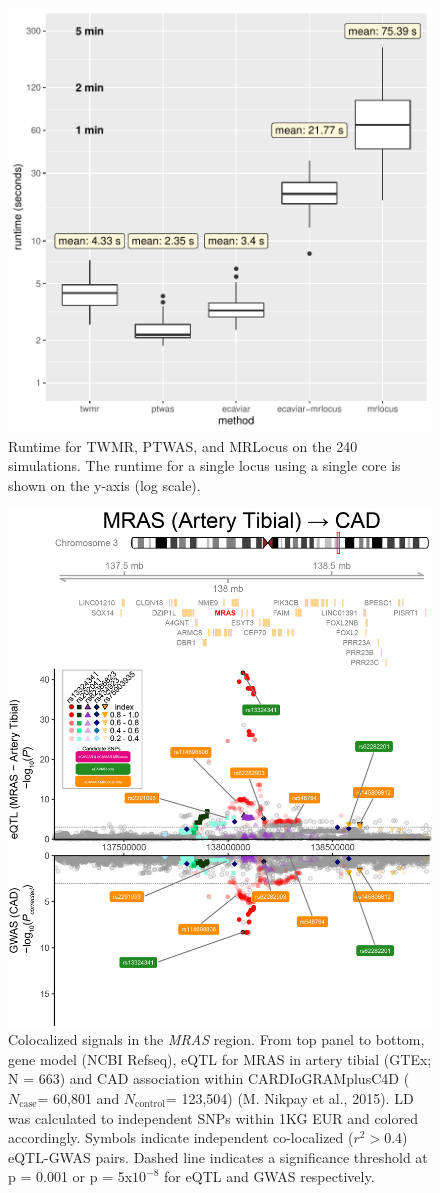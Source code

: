 \documentclass[11pt]{article}
\newcommand{\Ncase}{$N_{\textrm{case}}$\xspace}
\newcommand{\Ncontrol}{$N_{\textrm{control}}$\xspace}
\begin{document}
\begin{figure}[!ht]
  \centering
  \includegraphics[width=.7\textwidth]{figs/runtime}
  \caption{Runtime for TWMR, PTWAS, and MRLocus on the 240
    simulations. The runtime for a single locus using a single core is
    shown on the y-axis (log scale).}
\end{figure}

\begin{figure}[!ht]
  \centering
  \includegraphics[width=.7\textwidth]{figs/region/regionplot.MRAS_Artery_Tibial_CAD.20201218.png}
  \caption{Colocalized signals in the \emph{MRAS} region. From top panel to
    bottom, gene model (NCBI Refseq), eQTL for MRAS in artery tibial
    (GTEx; N = 663) and CAD association within CARDIoGRAMplusC4D
    (\Ncase = 60,801 and \Ncontrol = 123,504) (M. Nikpay et al.,
    2015). LD was calculated to independent SNPs within 1KG EUR and
    colored accordingly. Symbols indicate independent co-localized
    ($r^2 > 0.4$) eQTL-GWAS pairs. Dashed line indicates a significance
    threshold at p = 0.001 or p = 5x$10^{-8}$ for eQTL and GWAS
    respectively.}
\end{figure}
\end{document}
